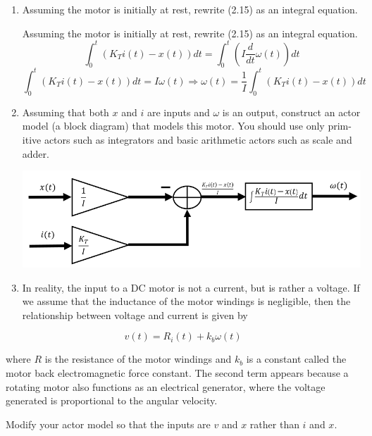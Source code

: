 \documentclass[12pt]{article}
\begin{document}
\begin{enumerate}
	\item Assuming the motor is initially at rest, rewrite (2.15) as an integral equation.
	\begin{qsolve}[Solution]
		Assuming the motor is initially at rest, rewrite (2.15) as an integral equation.
		$$ \int_{0}^{t}(K_Ti(t)-x(t))dt=\int_{0}^{t}(I\frac{d}{dt}\omega(t))dt $$
		$$ \int_{0}^{t}(K_Ti(t)-x(t))dt=I\omega(t) \Rightarrow \omega(t)=\frac{1}{I}\int_{0}^{t}(K_Ti(t)-x(t))dt $$
	\end{qsolve}
	
	
	
	
	
	
	
	\item Assuming that both $x$ and $i$ are inputs and $\omega$ is an output, construct an actor
	model (a block diagram) that models this motor. You should use only prim-
	itive actors such as integrators and basic arithmetic actors such as scale and
	adder.
	\begin{qsolve}[Solution]
		
		\centering\includegraphics*[width=1\linewidth]{images/img3}
	\end{qsolve}
	
	
	
	\item In reality, the input to a DC motor is not a current, but is rather a voltage. If
	we assume that the inductance of the motor windings is negligible, then the
	relationship between voltage and current is given by
\end{enumerate}

$$ v(t)=R_i(t)+k_b\omega(t) $$

where $R$ is the resistance of the motor windings and $k_b$ is a constant called the
motor back electromagnetic force constant. The second term appears because
a rotating motor also functions as an electrical generator, where the voltage
generated is proportional to the angular velocity.

Modify your actor model so that the inputs are $v$ and $x$ rather than $i$ and $x$.
\end{document}
